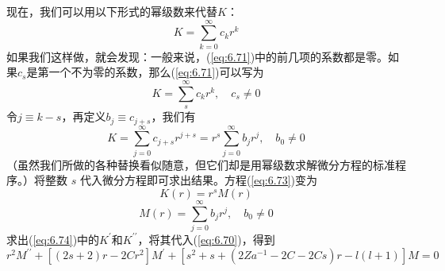    现在，我们可以用以下形式的幂级数来代替$K$：
   \begin{equation}
        K = \sum_{k=0}^{\infty}c_kr^k
        \label{eq:6.71}
   \end{equation}
   如果我们这样做，就会发现：一般来说，(\ref{eq:6.71})中的前几项的系数都是零。如果$c_s$是第一个不为零的系数，那么(\ref{eq:6.71})可以写为
   \begin{equation}
        K = \sum_{s}^{\infty}c_kr^k, \quad c_s \neq 0
        \label{eq:6.72}
   \end{equation}
   令$j \equiv k-s$，再定义$b_j \equiv c_{j+s}$，我们有
   \begin{equation}
        K = \sum_{j=0}^{\infty}c_{j+s}r^{j+s} = r^s\sum_{j=0}^{\infty}b_jr^j, \quad b_0 \neq 0
        \label{eq:6.73}
   \end{equation}
   （虽然我们所做的各种替换看似随意，但它们却是用幂级数求解微分方程的标准程序。）将整数 $s$ 代入微分方程即可求出结果。方程(\ref{eq:6.73})变为
   \begin{equation}
        K\left(r\right) = r^sM\left(r\right)
        \label{eq:6.74}
   \end{equation}
   \begin{equation}
        M\left(r\right) = \sum_{j=0}^{\infty}b_jr^j, \quad b_0 \neq 0
        \label{eq:6.75}
   \end{equation}
   求出(\ref{eq:6.74})中的$K^{\prime}$和$K^{\prime\prime}$，将其代入(\ref{eq:6.70})，得到
   \begin{equation}
        r^2M^{\prime\prime} + \left[\left(2s+2\right)r - 2Cr^2\right]M^{\prime} + \left[s^2 + s + \left(2Za^{-1} - 2C -2Cs\right)r - l\left(l+1\right)\right]M = 0
        \label{eq:6.76}
   \end{equation}


